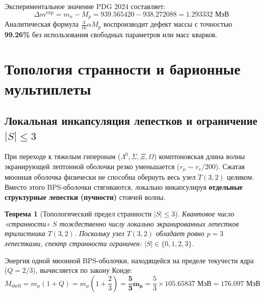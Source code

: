\documentclass[12pt,a4paper]{article}
\newtheorem{theorem}{Теорема}
\begin{document}
Экспериментальное значение PDG 2024 составляет:
\begin{equation}
	\Delta m^{\text{exp}} = m_n - M_p = 939.565420 - 938.272088 = \mathbf{1.293332 \text{ МэВ}}
\end{equation}
Аналитическая формула $\frac{3}{16}\alpha M_p$ воспроизводит дефект массы с точностью \textbf{99.26\%} без использования свободных параметров или масс кварков.

\section{Топология странности и барионные мультиплеты}

\subsection{Локальная инкапсуляция лепестков и ограничение $|S| \le 3$}
При переходе к тяжелым гиперонам ($\Lambda^0, \Sigma, \Xi, \Omega$) комптоновская длина волны экранирующей лептонной оболочки резко уменьшается ($r_\mu \sim r_e / 200$). Сжатая мюонная оболочка физически не способна обернуть весь узел $T(3,2)$ целиком. Вместо этого BPS-оболочки стягиваются, локально инкапсулируя \textbf{отдельные структурные лепестки (пучности)} стоячей волны.

\begin{theorem}[Топологический предел странности $|S| \le 3$]
	Квантовое число «странности» $S$ тождественно числу локально экранированных лепестков трилистника $T(3,2)$. Поскольку узел $T(3,2)$ обладает ровно $p=3$ лепестками, спектр странности ограничен: $|S| \in \{0, 1, 2, 3\}$.
\end{theorem}

Энергия одной мюонной BPS-оболочки, находящейся на пределе текучести ядра ($Q = 2/3$), вычисляется по закону Коиде:
\begin{equation}
	M_{\text{shell}} = m_\mu (1 + Q) = m_\mu \left(1 + \frac{2}{3}\right) = \mathbf{\frac{5}{3} m_\mu} = \frac{5}{3} \times 105.65837 \text{ МэВ} = \mathbf{176.097 \text{ МэВ}}
\end{equation}
\end{document}
